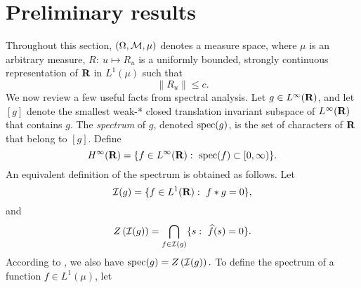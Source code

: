 \section{Preliminary results}
\newtheorem{defspec}{Definition}[section]
\newtheorem{useful}[defspec]{Remark}
\newtheorem{proposition1-sec2}[defspec]{Proposition}
\newtheorem{proposition2-sec2}[defspec]{Proposition}
\newtheorem{corollary-prop}[defspec]{Corollary}
\newtheorem{prop-spectrum}[defspec]{Proposition}
\newtheorem{lemma1}[defspec]{Lemma}
\newtheorem{lemma2}[defspec]{Lemma}
\newtheorem{lemma3}[defspec]{Lemma}
\newtheorem{lemma4}[defspec]{Lemma}
\newtheorem{lemma5}[defspec]{Lemma}
Throughout this section, 
 $(\Omega,{\cal M},\mu)$ denotes a measure space,
where $\mu$ is an arbitrary measure,  
$R:\ u\mapsto R_u$ is a uniformly
bounded, strongly continuous representation of 
$\R$ in $L^1(\mu)$ 
such that
\begin{equation}
\|R_u\|\leq c.
\label{uniform-norm}
\end{equation}
We now review a few useful
facts from spectral analysis.
Let $g \in L^\infty(\R)$, and let 
$[g]$ denote the smallest weak-* closed
translation invariant subspace of $L^\infty(\R)$
that contains $g$.  The {\em spectrum}
of $g$, denoted
${\rm spec} (g)$,
 is the set of characters
of $\R$ that belong to $[g]$.
Define 
$$H^\infty(\R)=\{f\in L^\infty(\R):\ \spec(f)\subset [0,\infty)\}.$$
An equivalent definition of the spectrum 
is obtained as follows.  Let 
$$\cI(g)=\{f\in L^1(\R):\ f*g=0 \},$$
and
$$Z\left({\cal I}(g) \right)=
\bigcap_{f\in {\cal I} (g)}\{s:\ \widehat{f}(s)=0\}.$$
According to \cite[(40.21)(i)]{hr2}, we also have
${\rm spec} (g)=
Z\left({\cal I}(g)\right).$
To define the spectrum of a function $f\in L^1(\mu)$, 
let
